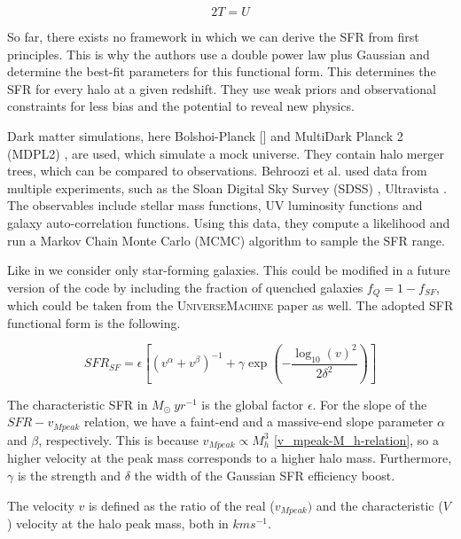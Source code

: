\begin{equation}
    2T=U
\end{equation}

So far, there exists no framework in which we can derive the SFR from first principles. This is why the authors use a double power law plus Gaussian and determine the best-fit parameters for this functional form. This determines the SFR for every halo at a given redshift. They use weak priors and observational constraints for less bias and the potential to reveal new physics.

Dark matter simulations, here Bolshoi-Planck [\cite{klypin_dark_2011}] and MultiDark Planck 2 (MDPL2) \cite{klypin_multidark_2016}, are used, which simulate a mock universe. They contain halo merger trees, which can be compared to observations. Behroozi et al. used data from multiple experiments, such as the Sloan Digital Sky Survey (SDSS) \cite{abazajian_seventh_2009}, Ultravista \cite{mccracken_ultravista_2012}. The observables include stellar mass functions, UV luminosity functions and galaxy auto-correlation functions.
Using this data, they compute a likelihood and run a Markov Chain Monte Carlo (MCMC) algorithm to sample the SFR range.

Like in \cite{dallarmi_dipole_2022} we consider only star-forming galaxies. This could be modified in a future version of the code by including the fraction of quenched galaxies $f_Q = 1 -f_{SF}$, which could be taken from the \textsc{UniverseMachine} paper as well. The adopted SFR functional form is the following.

\begin{equation}
    SFR_{SF} = \epsilon \left[ \left( v^\alpha + v^\beta \right)^{-1} + \gamma \exp \left(-\frac{\log_{10}(v)^2}{2\delta^2}\right) \right]
\end{equation}

The characteristic SFR  in $M_\odot\ yr^{-1}$ is the global factor $\epsilon$. For the slope of the $SFR-v_{Mpeak}$ relation, we have a faint-end and a massive-end slope parameter $\alpha$ and $\beta$, respectively. This is because $v_{Mpeak} \propto M_h^3$ \ref{v_mpeak-M_h-relation}, so a higher velocity at the peak mass corresponds to a higher halo mass.
Furthermore, $\gamma$ is the strength and $\delta$ the width of the Gaussian SFR efficiency boost. 

The velocity $v$ is defined as the ratio of the real ($v_{Mpeak})$ and the characteristic ($V$) velocity at the halo peak mass, both in $km s^{-1}$.

